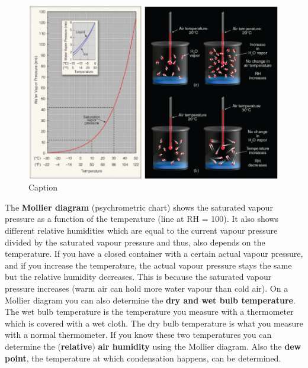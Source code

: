 \documentclass[12pt,oneside]{book}
\begin{document}
\begin{figure}

{\centering \includegraphics[width=0.9\linewidth]{figures/Figure232} 

}

\caption{Caption}\label{fig:VP}
\end{figure}

The \textbf{Mollier diagram} (psychrometric chart) shows the saturated
vapour pressure as a function of the temperature (line at RH = 100). It
also shows different relative humidities which are equal to the current
vapour pressure divided by the saturated vapour pressure and thus, also
depends on the temperature. If you have a closed container with a
certain actual vapour pressure, and if you increase the temperature, the
actual vapour pressure stays the same but the relative humidity
decreases. This is because the saturated vapour pressure increases (warm
air can hold more water vapour than cold air). On a Mollier diagram you
can also determine the \textbf{dry and wet bulb temperature}. The wet
bulb temperature is the temperature you measure with a thermometer which
is covered with a wet cloth. The dry bulb temperature is what you
measure with a normal thermometer. If you know these two temperatures
you can determine the (\textbf{relative}) \textbf{air humidity} using
the Mollier diagram. Also the \textbf{dew point}, the temperature at
which condensation happens, can be determined.
\end{document}
